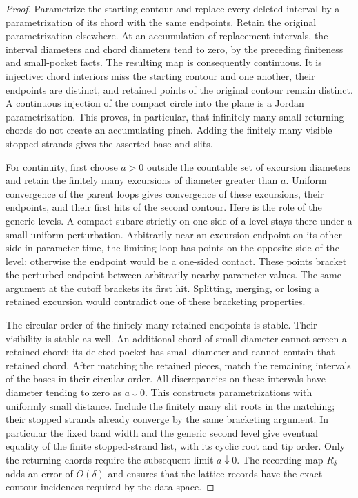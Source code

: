 \documentclass[11pt]{article}
\theoremstyle{definition}
\theoremstyle{remark}
\numberwithin{equation}{section}
\begin{document}
\begin{proof}
Parametrize the starting contour and replace every deleted interval
by a parametrization of its chord with the same endpoints.  Retain
the original parametrization elsewhere.  At an accumulation of
replacement intervals, the interval diameters and chord diameters
tend to zero, by the preceding finiteness and small-pocket facts.
The resulting map is consequently continuous.  It is injective:
chord interiors miss the starting contour and one another, their
endpoints are distinct, and retained points of the original contour
remain distinct.  A continuous injection of the compact circle into
the plane is a Jordan parametrization.  This proves, in particular,
that infinitely many small returning chords do not create an
accumulating pinch.  Adding the finitely many visible stopped strands
gives the asserted base and slits.

For continuity, first choose $a>0$ outside the countable set of excursion
diameters and retain the finitely many excursions of diameter greater
than $a$. Uniform convergence of the parent loops
gives convergence of these excursions, their endpoints, and their
first hits of the second contour.  Here is the role of the generic
levels.  A compact subarc strictly on one side of a level stays there
under a small uniform perturbation. Arbitrarily near an excursion
endpoint on its other side in parameter time, the limiting loop has
points on the opposite side of the level; otherwise the endpoint
would be a one-sided contact. These points bracket the perturbed endpoint
between arbitrarily nearby parameter values.  The same argument at
the cutoff brackets its first hit.  Splitting, merging, or losing a
retained excursion would contradict one of these bracketing
properties.

The circular order of the finitely many retained endpoints is stable.
Their visibility is stable as well.  An additional chord of small
diameter cannot screen a retained chord: its deleted pocket has small
diameter and cannot contain that retained chord.  After matching the
retained pieces, match the remaining intervals of the bases in their
circular order.  All discrepancies on these intervals have diameter
tending to zero as $a\downarrow0$.  This constructs parametrizations
with uniformly small distance.  Include the finitely many slit roots
in the matching; their stopped strands already converge by the same
bracketing argument. In particular the fixed band width and the generic
second level give eventual equality of the finite stopped-strand list,
with its cyclic root and tip order. Only the returning chords require
the subsequent limit $a\downarrow0$. The recording map $R_\delta$ adds
an error of $O(\delta)$ and ensures that the lattice records have the
exact contour incidences required by the data space.


\end{proof}
\end{document}
